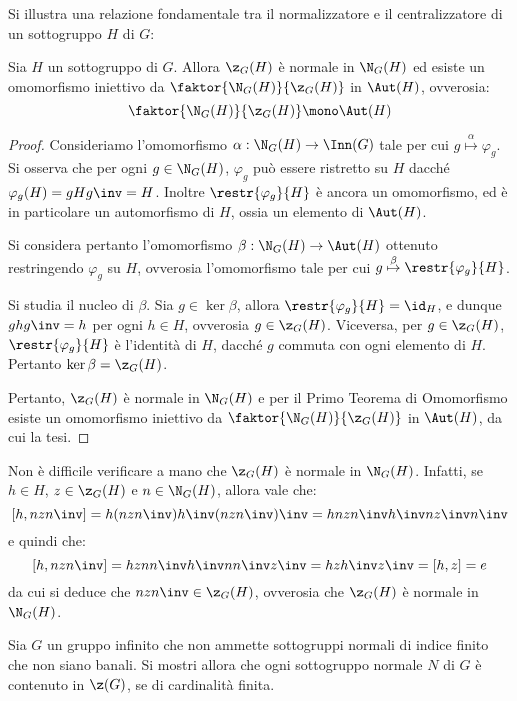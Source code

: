 \documentclass[11pt]{scrartcl}
\begin{document}
	Si illustra una relazione fondamentale tra il normalizzatore e il centralizzatore
	di un sottogruppo $H$ di $G$:
	
	\begin{proposition}
		\label{prop:norm_centr}
		Sia $H$ un sottogruppo di $G$. Allora $\z_G(H)$ è normale in $\N_G(H)$ ed
		esiste un omomorfismo iniettivo da $\faktor{\N_G(H)}{\z_G(H)}$ in
		$\Aut(H)$, ovverosia:
		\[ \faktor{\N_G(H)}{\z_G(H)} \mono \Aut(H) \]
	\end{proposition}
	
	\begin{proof}
		Consideriamo l'omomorfismo $\alpha : \N_G(H) \to \Inn(G)$ tale per cui
		$g \overset{\alpha}{\mapsto} \varphi_g$. Si osserva che per ogni $g \in \N_G(H)$, $\varphi_g$ può
		essere ristretto su $H$ dacché $\varphi_g(H) = gHg\inv = H$. Inoltre
		$\restr{\varphi_g}{H}$ è ancora un omomorfismo, ed è in particolare un
		automorfismo di $H$, ossia un elemento di $\Aut(H)$. \medskip
		
		
		Si considera pertanto l'omomorfismo $\beta : \N_G(H) \to \Aut(H)$ ottenuto
		restringendo $\varphi_g$ su $H$, ovverosia l'omomorfismo tale per cui
		$g \overset{\beta}{\mapsto} \restr{\varphi_g}{H}$. \medskip
		
		
		Si studia il nucleo di $\beta$. Sia $g \in \ker \beta$, allora $\restr{\varphi_g}{H} = \id_H$, e dunque $ghg\inv = h$ per ogni $h \in H$, ovverosia $g \in \z_G(H)$.
		Viceversa, per $g \in \z_G(H)$, $\restr{\varphi_g}{H}$ è l'identità di $H$, dacché
		$g$ commuta con ogni elemento di $H$. Pertanto $\ker \beta = \z_G(H)$. \medskip
		
		
		Pertanto, $\z_G(H)$ è normale in $\N_G(H)$ e per il Primo Teorema di Omomorfismo
		esiste un omomorfismo iniettivo da $\faktor{\N_G(H)}{\z_G(H)}$ in
		$\Aut(H)$, da cui la tesi.
	\end{proof}
	
	\begin{remark}
		Non è difficile verificare a mano che $\z_G(H)$ è normale in $\N_G(H)$. Infatti,
		se $h \in H$, $z \in \z_G(H)$ e $n \in \N_G(H)$, allora vale che:
		\[ [h, nzn\inv] = h (nzn\inv) h\inv (nzn\inv)\inv= hnzn\inv h\inv n z\inv n\inv \]
		e quindi che:
		\[ [h, nzn\inv] = hz n n\inv h\inv n n\inv z\inv = hzh\inv z\inv = [h, z] = e \]
		da cui si deduce che $nzn\inv \in \z_G(H)$, ovverosia che $\z_G(H)$ è normale
		in $\N_G(H)$.
	\end{remark}
	
	\begin{exercise}[$\star$]
		Sia $G$ un gruppo infinito che non ammette sottogruppi normali di indice finito che
		non siano banali. Si mostri allora che ogni sottogruppo normale $N$ di $G$
		è contenuto in $\z(G)$, se di cardinalità finita.
	\end{exercise}
	
\end{document}
